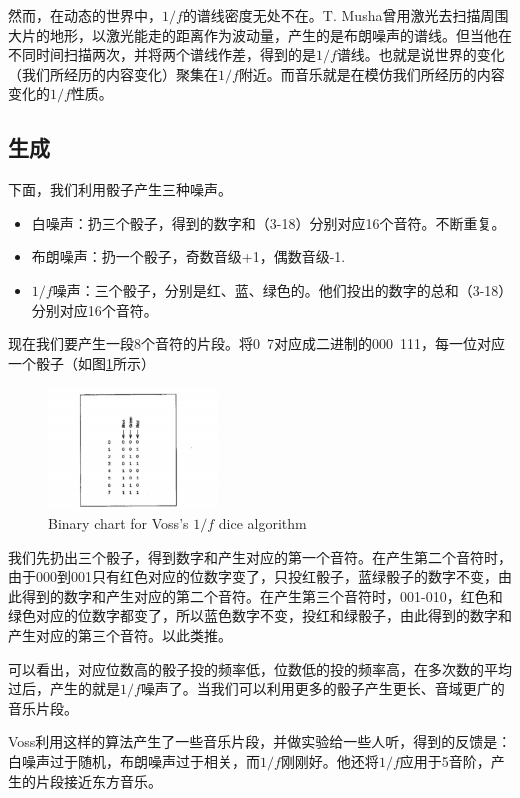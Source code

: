 \documentclass[11pt]{article}
\begin{document}
然而，在动态的世界中，$1/f$的谱线密度无处不在。T. Musha曾用激光去扫描周围大片的地形，以激光能走的距离作为波动量，产生的是布朗噪声的谱线。但当他在不同时间扫描两次，并将两个谱线作差，得到的是$1/f$谱线。也就是说世界的变化（我们所经历的内容变化）聚集在$1/f$附近。而音乐就是在模仿我们所经历的内容变化的$1/f$性质。

\subsection{生成}
下面，我们利用骰子产生三种噪声。
\begin{itemize}
\item 白噪声：扔三个骰子，得到的数字和（3-18）分别对应16个音符。不断重复。
\item 布朗噪声：扔一个骰子，奇数音级+1，偶数音级-1.
\item $1/f$噪声：三个骰子，分别是红、蓝、绿色的。他们投出的数字的总和（3-18）分别对应16个音符。
\end{itemize}
现在我们要产生一段8个音符的片段。将0~7对应成二进制的000~111，每一位对应一个骰子（如图\ref{fig:1.2.3}所示）

\begin{figure}[hptb]
	\centering
	\label{fig:1.2.3}
	\includegraphics[width=0.4\textwidth]{pic/1.2.3.eps}
	\caption{Binary chart for Voss's $1/f$ dice algorithm}
\end{figure}

我们先扔出三个骰子，得到数字和产生对应的第一个音符。在产生第二个音符时，由于000到001只有红色对应的位数字变了，只投红骰子，蓝绿骰子的数字不变，由此得到的数字和产生对应的第二个音符。在产生第三个音符时，001-010，红色和绿色对应的位数字都变了，所以蓝色数字不变，投红和绿骰子，由此得到的数字和产生对应的第三个音符。以此类推。

可以看出，对应位数高的骰子投的频率低，位数低的投的频率高，在多次数的平均过后，产生的就是$1/f$噪声了。当我们可以利用更多的骰子产生更长、音域更广的音乐片段。

Voss利用这样的算法产生了一些音乐片段，并做实验给一些人听，得到的反馈是：
白噪声过于随机，布朗噪声过于相关，而$1/f$刚刚好。他还将$1/f$应用于5音阶，产生的片段接近东方音乐。
\end{document}
